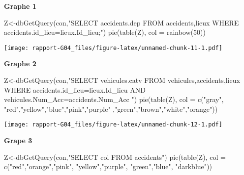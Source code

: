 \documentclass[mstat,12pt]{unswthesis}
\newenvironment{Shaded}{\begin{snugshade}}{\end{snugshade}}
\newcommand{\AttributeTok}[1]{\textcolor[rgb]{0.77,0.63,0.00}{#1}}
\newcommand{\DecValTok}[1]{\textcolor[rgb]{0.00,0.00,0.81}{#1}}
\newcommand{\FunctionTok}[1]{\textcolor[rgb]{0.00,0.00,0.00}{#1}}
\newcommand{\NormalTok}[1]{#1}
\newcommand{\OtherTok}[1]{\textcolor[rgb]{0.56,0.35,0.01}{#1}}
\newcommand{\StringTok}[1]{\textcolor[rgb]{0.31,0.60,0.02}{#1}}
\begin{document}
\medskip

\textbf{Graphe 1}

\begin{Shaded}
\begin{Highlighting}[]
\NormalTok{Z}\OtherTok{\textless{}{-}}\FunctionTok{dbGetQuery}\NormalTok{(con,}\StringTok{"SELECT accidents.dep}
\StringTok{FROM accidents,lieux}
\StringTok{WHERE accidents.id\_lieu=lieux.Id\_lieu;"}\NormalTok{)}
\FunctionTok{pie}\NormalTok{(}\FunctionTok{table}\NormalTok{(Z), }\AttributeTok{col =} \FunctionTok{rainbow}\NormalTok{(}\DecValTok{50}\NormalTok{))}
\end{Highlighting}
\end{Shaded}

\texttt{[image: rapport-G04\_files/figure-latex/unnamed-chunk-11-1.pdf]}

\medskip

\textbf{Graphe 2}

\begin{Shaded}
\begin{Highlighting}[]
\NormalTok{Z}\OtherTok{\textless{}{-}}\FunctionTok{dbGetQuery}\NormalTok{(con,}\StringTok{"SELECT vehicules.catv}
\StringTok{FROM vehicules,accidents,lieux}
\StringTok{WHERE accidents.id\_lieu=lieux.Id\_lieu AND vehicules.Num\_Acc=accidents.Num\_Acc }
\StringTok{"}\NormalTok{)}
\FunctionTok{pie}\NormalTok{(}\FunctionTok{table}\NormalTok{(Z), }\AttributeTok{col =} \FunctionTok{c}\NormalTok{(}\StringTok{"gray"}\NormalTok{, }\StringTok{"red"}\NormalTok{,}\StringTok{"yellow"}\NormalTok{,}\StringTok{"blue"}\NormalTok{,}\StringTok{"pink"}\NormalTok{,}\StringTok{"purple"}
\NormalTok{                      ,}\StringTok{"green"}\NormalTok{,}\StringTok{"brown"}\NormalTok{,}\StringTok{"white"}\NormalTok{,}\StringTok{"orange"}\NormalTok{))}
\end{Highlighting}
\end{Shaded}

\texttt{[image: rapport-G04\_files/figure-latex/unnamed-chunk-12-1.pdf]}

\medskip

\textbf{Grape 3}

\begin{Shaded}
\begin{Highlighting}[]
\NormalTok{Z}\OtherTok{\textless{}{-}}\FunctionTok{dbGetQuery}\NormalTok{(con,}\StringTok{"SELECT col}
\StringTok{FROM accidents"}\NormalTok{)}
\FunctionTok{pie}\NormalTok{(}\FunctionTok{table}\NormalTok{(Z), }\AttributeTok{col =} \FunctionTok{c}\NormalTok{(}\StringTok{"red"}\NormalTok{,}\StringTok{"orange"}\NormalTok{,}\StringTok{"pink"}\NormalTok{, }\StringTok{"yellow"}\NormalTok{,}\StringTok{"purple"}\NormalTok{,}
                      \StringTok{"green"}\NormalTok{,}\StringTok{"blue"}\NormalTok{, }\StringTok{"darkblue"}\NormalTok{))}
\end{Highlighting}
\end{Shaded}
\end{document}
